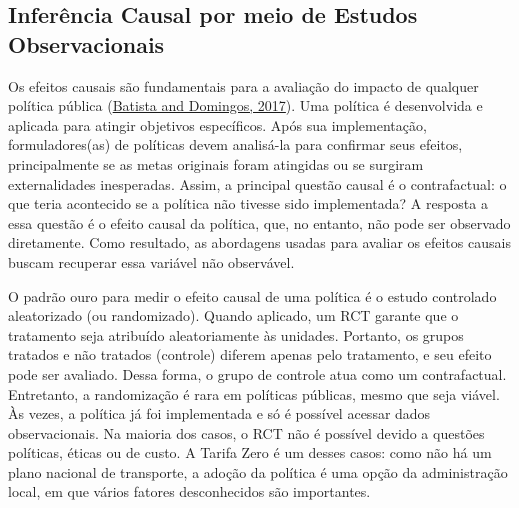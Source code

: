 \documentclass[12pt, a4paper, twoside]{article}
\numberwithin{equation}{subsection} %
\begin{document}
\hypertarget{inferuxeancia-causal-por-meio-de-estudos-observacionais}{%
\subsection{Inferência Causal por meio de Estudos
Observacionais}\label{inferuxeancia-causal-por-meio-de-estudos-observacionais}}

Os efeitos causais são fundamentais para a avaliação do impacto de
qualquer política pública
(\protect\hyperlink{ref-batista_domingos_2017}{Batista and Domingos,
2017}). Uma política é desenvolvida e aplicada para atingir objetivos
específicos. Após sua implementação, formuladores(as) de políticas devem
analisá-la para confirmar seus efeitos, principalmente se as metas
originais foram atingidas ou se surgiram externalidades inesperadas.
Assim, a principal questão causal é o contrafactual: o que teria
acontecido se a política não tivesse sido implementada? A resposta a
essa questão é o efeito causal da política, que, no entanto, não pode
ser observado diretamente. Como resultado, as abordagens usadas para
avaliar os efeitos causais buscam recuperar essa variável não
observável.

O padrão ouro para medir o efeito causal de uma política é o estudo
controlado aleatorizado (ou randomizado). Quando aplicado, um RCT
garante que o tratamento seja atribuído aleatoriamente às unidades.
Portanto, os grupos tratados e não tratados (controle) diferem apenas
pelo tratamento, e seu efeito pode ser avaliado. Dessa forma, o grupo de
controle atua como um contrafactual. Entretanto, a randomização é rara
em políticas públicas, mesmo que seja viável. Às vezes, a política já
foi implementada e só é possível acessar dados observacionais. Na
maioria dos casos, o RCT não é possível devido a questões políticas,
éticas ou de custo. A Tarifa Zero é um desses casos: como não há um
plano nacional de transporte, a adoção da política é uma opção da
administração local, em que vários fatores desconhecidos são
importantes.
\end{document}
